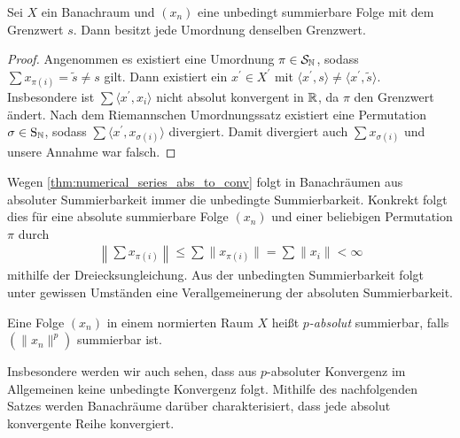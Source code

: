 \begin{sz}\label{th:every_rearrangement_same_limit}
	Sei $ X $ ein Banachraum und $ (x_n) $ eine unbedingt summierbare Folge mit dem Grenzwert $ s $.
	Dann besitzt jede Umordnung denselben Grenzwert.
\end{sz}

\begin{proof}
	Angenommen es existiert eine Umordnung $ \pi \in \mathcal{S}_{\mathbb{N}} $, sodass
	$ \sum x_{\pi(i)} = \tilde{s} \neq s $ gilt.
	Dann existiert ein $ x^\prime \in X^\prime $ mit $ \langle x^\prime,s \rangle  \neq \langle x^\prime,\tilde{s}\rangle $.
	Insbesondere ist $  \sum \langle x^\prime ,x_i \rangle $ nicht absolut konvergent in $ \mathbb{R} $, da $ \pi $ den Grenzwert ändert.
	Nach dem Riemannschen Umordnungssatz existiert eine Permutation $ \sigma \in \mathrm{S}_{\mathbb{N}} $, sodass $ \sum \langle x^\prime ,x_{\sigma(i)} \rangle $ divergiert.
	Damit divergiert auch $ \sum x_{\sigma(i)} $ und unsere Annahme war falsch.
\end{proof}

Wegen \ref{thm:numerical_series_abs_to_conv} folgt in Banachräumen aus absoluter Summierbarkeit immer die unbedingte Summierbarkeit.
Konkrekt folgt dies für eine absolute summierbare Folge $ (x_n) $
und einer beliebigen Permutation $  \pi  $ durch
\begin{align*}
	\left\|\sum x_{\pi(i)} \right\| \leq \sum \|x_{\pi(i)} \| = 
	\sum \|x_{i} \| < \infty
\end{align*}
mithilfe der Dreiecksungleichung. Aus der unbedingten Summierbarkeit folgt unter gewissen Umständen eine Verallgemeinerung der absoluten Summierbarkeit.

\begin{df}
	Eine Folge $ (x_n) $ in einem normierten Raum $ X $ heißt $p $\textit{-absolut} summierbar, falls $ (\|x_n\|^p)  $ summierbar ist.
\end{df}
Insbesondere werden wir auch sehen, dass aus $ p $-absoluter Konvergenz im Allgemeinen keine unbedingte Konvergenz folgt.
Mithilfe des nachfolgenden Satzes werden Banachräume darüber charakterisiert, dass jede absolut konvergente Reihe konvergiert.

